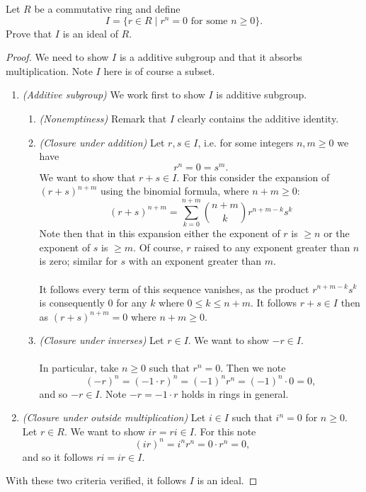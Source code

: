 \documentclass[12pt]{article}
\newenvironment{ex}[2][Exercise]{\begin{trivlist}
\item[\hskip \labelsep {\bfseries #1}\hskip \labelsep {\bfseries #2.}]}{\end{trivlist}}
\begin{document}
\begin{ex}{2}
    Let $R$ be a commutative ring and define 
    $$I = \{r \in R \; | \; r^n = 0 \text{ for some } n \geq 0\}.$$
    Prove that $I$ is an ideal of $R$.
    \begin{proof}
        We need to show $I$ is a additive subgroup and that it absorbs multiplication. Note $I$ here is of course a subset.
        \begin{enumerate}[label=(\alph*)]
            \item \textit{(Additive subgroup)} We work first to show $I$ is additive subgroup.
            \begin{enumerate}[label=(\roman*)]
                \item \textit{(Nonemptiness)}
                Remark that $I$ clearly contains the additive identity.
                \item \textit{(Closure under addition)}
                Let $r, s \in I$, i.e. for some integers $n, m \geq 0$ we have 
                $$r^n = 0 = s^m.$$
                We want to show that $r + s \in I$. For this consider the expansion of $(r + s)^{n + m}$ using the binomial formula, where $n + m \geq 0$:
                $$(r + s)^{n + m} = \sum_{k = 0}^{n + m} \binom{n + m}{k} r^{n + m - k}s^k$$
                Note then that in this expansion either the exponent of $r$ is $\geq n$ or the exponent of $s$ is $\geq m$. Of course, $r$ raised to any exponent greater than $n$ is zero; similar for $s$ with an exponent greater than $m$. \\ \\
                It follows every term of this sequence vanishes, as the product $r^{n + m - k}s^k$ is consequently $0$ for any $k$ where $0 \leq k \leq n+m$. It follows $r + s \in I$ then as $(r + s)^{n + m} = 0$ where $n + m \geq 0$.
                \item \textit{(Closure under inverses)} Let $r \in I$. We want to show $-r \in I$. \\ \\
                In particular, take $n \geq 0$ such that $r^n = 0$. Then we note 
                $$(-r)^n = (-1 \cdot r)^n = (-1)^nr^n = (-1)^n \cdot 0 = 0,$$
                and so $-r \in I$. Note $-r = -1 \cdot r$ holds in rings in general.
            \end{enumerate}
        \item \textit{(Closure under outside multiplication)} Let $i \in I$ such that $i^n = 0$ for $n \geq 0$. Let $r \in R$. We want to show $ir = ri \in I$. For this note
        $$(ir)^n = i^nr^n = 0 \cdot r^n = 0,$$
        and so it follows $ri = ir \in I$.
        \end{enumerate}
        With these two criteria verified, it follows $I$ is an ideal.
    \end{proof}
\end{ex}
\end{document}
